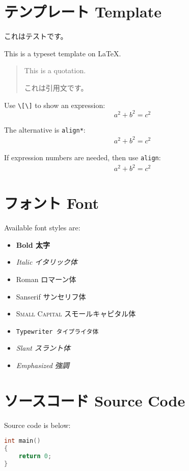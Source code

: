 




\section{テンプレート Template}

これはテストです。

This is a typeset template on \LaTeX.

\begin{quotation}
This is a quotation. 

これは引用文です。
\end{quotation}

Use \verb|\[\]| to show an expression:
\[a^2+b^2=c^2\]

The alternative is \verb|align*|:
\begin{align*}
a^2+b^2=c^2
\end{align*}

If expression numbers are needed, then use \verb|align|:
\begin{align}
a^2+b^2=c^2
\end{align}

\section{フォント Font}
Available font styles are:
\begin{itemize}
\item \textbf{Bold 太字}
\item \textit{Italic イタリック体}
\item \textrm{Roman ロマーン体}
\item \textsf{Sanserif サンセリフ体}
\item \textsc{Small Capital スモールキャピタル体}
\item \texttt{Typewriter タイプライタ体}
\item \textsl{Slant スラント体}
\item \emph{Emphasized 強調}
\end{itemize}

\section{ソースコード Source Code}
Source code is below:
\begin{lstlisting}[language=c]
int main()
{
    return 0;
}
\end{lstlisting}

\nocite{*} %

